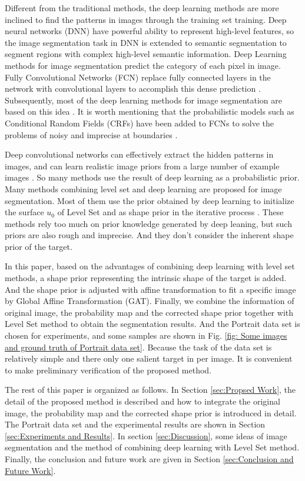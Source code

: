 Different from the traditional methods, the deep learning methods are more inclined to find the patterns in images through the training set training. Deep neural networks (DNN) have powerful ability to represent high-level features, so the image segmentation task in DNN is extended to semantic segmentation to segment regions with complex high-level semantic information. Deep Learning methods for image segmentation predict the category of each pixel in image. Fully Convolutional Networks (FCN) replace fully connected layers in the network with convolutional layers to accomplish this dense prediction \cite{FCN-original:long2015fully}. Subsequently, most of the deep learning methods for image segmentation are based on this idea \cite{Introduction:FCN:ronneberger2015u} \cite{Introduction:FCN:badrinarayanan2017segnet}. It is worth mentioning that the probabilistic models such as Conditional Random Fields (CRFs) have been added to FCNs to solve the problems of noisy and imprecise at boundaries \cite{Introduction:FCN:chen2018deeplab} \cite{FCN:CRF:zheng2015conditional}.

Deep convolutional networks can effectively extract the hidden patterns in images, and can learn realistic image priors from a large number of example images \cite{Introduction:FCN:prior:UlyanovVL17}. So many methods use the result of deep learning as a probabilistic prior. Many methods combining level set and deep learning are proposed for image segmentation. Most of them use the prior obtained by deep learning to initialize the surface $u_0$ of Level Set and as shape prior in the iterative process \cite{Introduction:deep:LevelSet:hu2017deep} \cite{Introduction:deep:LevelSet:tang2017deep}. These methods rely too much on prior knowledge generated by deep leaning, but such priors are also rough and imprecise. And they don't consider the inherent shape prior of the target.

In this paper, based on the advantages of combining deep learning with level set methods, a shape prior representing the intrinsic shape of the target is added. And the shape prior is adjusted with affine transformation to fit a specific image by Global Affine Transformation (GAT). Finally, we combine the information of original image, the probability map and the corrected shape prior together with Level Set method to obtain the segmentation results. And the Portrait data set \cite{FCN:segmentation:shen2016automatic} is chosen for experiments, and some samples are shown in Fig. \ref{fig: Some images and ground truth of Portrait data set}. Because the task of the data set is relatively simple and there only one salient target in per image. It is convenient to make preliminary verification of the proposed method.

The rest of this paper is organized as follows. In Section \ref{sec:Propsed Work}, the detail of the proposed method is described and how to integrate the original image, the probability map and the corrected shape prior is introduced in detail. The Portrait data set and the experimental results are shown in Section \ref{sec:Experiments and Results}. In section \ref{sec:Discussion}, some ideas of image segmentation and the method of combining deep learning with Level Set method. Finally, the conclusion and future work are given in Section \ref{sec:Conclusion and Future Work}.
